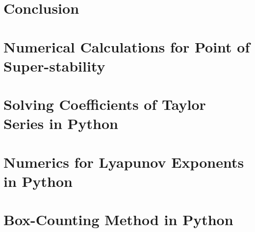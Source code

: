 \documentclass[12pt,oneside]{report}
\begin{document}
\chapter*{Conclusion}



%  
\printbibliography
{}

\begin{appendices}
	\chapter{Numerical Calculations for Point of Super-stability}
	
    \chapter{Solving Coefficients of Taylor Series in Python}
	
    \chapter{Numerics for Lyapunov Exponents in Python}
    
    \chapter{Box-Counting Method in Python}
    
\end{appendices}
\end{document}
